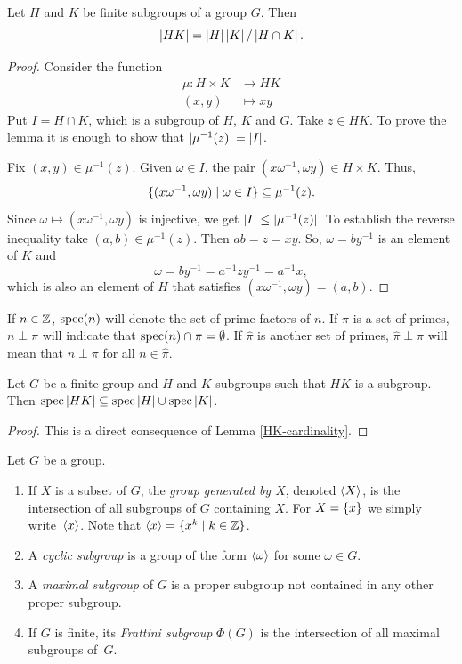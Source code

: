 \begin{lem}\label{HK-cardinality}
    Let $H$ and $K$ be finite subgroups of a group $G$. Then
    $$
        \left\vert{HK}\right\vert = \left\vert{H}\right\vert \left\vert{K}\right\vert / \left\vert{H\cap K}\right\vert.
    $$
\end{lem}
\begin{proof} Consider the function
\begin{align*}
    \mu\colon H\times K&\to HK\\
    (x,y)&\mapsto xy
\end{align*}
Put $I=H\cap K$, which is a subgroup of $H$, $K$ and $G$. Take $z\in HK$. To prove the lemma it is enough to show that $|\mu^{-1}(z)|=\left\vert{I}\right\vert$.

Fix $(x,y)\in\mu^{-1}(z)$. Given $\omega\in I$, the pair $(x\omega^{-1},\omega y)\in H\times K$. Thus,
$$
    \{(x\omega^{-1},\omega y)\mid\omega\in I\}\subseteq\mu^{-1}(z).
$$
Since $\omega\mapsto(x\omega^{-1},\omega y)$ is injective, we get $\left\vert{I}\right\vert\le|\mu^{-1}(z)|$. To establish the reverse inequality take $(a,b)\in\mu^{-1}(z)$. Then $ab=z=xy$. So, $\omega=by^{-1}$ is an element of $K$ and
$$
    \omega = by^{-1} = a^{-1}zy^{-1} = a^{-1}x,
$$
which is also an element of $H$ that satisfies $(x\omega^{-1},\omega y)=(a,b)$.

\end{proof}

\begin{ntns}
    If $n\in\mathbb{Z}$, $\operatorname{spec}(n)$ will denote the set of prime factors of $n$. If $\pi$ is a set of primes, $n\perp\pi$ will indicate that $\operatorname{spec}(n)\cap\pi=\emptyset$. If $\hat\pi$ is another set of primes, $\hat\pi\perp\pi$ will mean that $n\perp\pi$ for all $n\in\hat\pi$.
\end{ntns}

\begin{prop}\label{pi-product}
    Let $G$ be a finite group and $H$ and $K$ subgroups such that $HK$ is a subgroup. Then $\operatorname{spec}\left\vert{HK}\right\vert\subseteq\operatorname{spec}\left\vert{H}\right\vert\cup\operatorname{spec}\left\vert{K}\right\vert$.
\end{prop}

\begin{proof} This is a direct consequence of Lemma \ref{HK-cardinality}.  

\end{proof}

\begin{defns} Let $G$ be a group.
    \begin{enumerate}[\upshape i)]
        \item If\/ $X$ is a subset of\/ $G$, the \textsl{group generated by $X$}, denoted $\langle X\rangle$, is the intersection of all subgroups of $G$ containing $X$. For $X=\{x\}$ we simply write~$\langle x\rangle$. Note that $\langle x\rangle=\{x^k\mid k\in\mathbb{Z}\}$.
        \item A \textsl{cyclic subgroup} is a group of the form $\langle\omega\rangle$ for some $\omega\in G$.
        \item A \textsl{maximal subgroup} of\/ $G$ is a proper subgroup not contained in any other proper subgroup.
        \item If\/ $G$ is finite, its \textsl{Frattini subgroup} $\Phi(G)$ is the intersection of all maximal subgroups of~$G$.
    \end{enumerate}
\end{defns}

